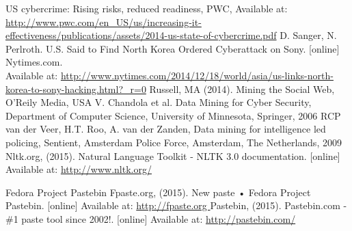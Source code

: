 \documentclass[12pt]{article}
\begin{document}
 
 
\printglossaries
\newpage

\begin{thebibliography}{99}
US cybercrime: Rising risks, reduced readiness, PWC, Available at: \url{http://www.pwc.com/en_US/us/increasing-it-effectiveness/publications/assets/2014-us-state-of-cybercrime.pdf}
	 D. Sanger, N. Perlroth.  U.S. Said to Find North Korea Ordered Cyberattack on Sony. [online] Nytimes.com. \\Available at: \url{http://www.nytimes.com/2014/12/18/world/asia/us-links-north-korea-to-sony-hacking.html?_r=0}
  Russell, MA (2014). Mining the Social Web, O'Reily Media, USA
    V. Chandola et al. Data Mining for Cyber Security, Department of Computer Science, University of Minnesota, Springer, 2006
   RCP van der Veer, H.T. Roo,  A. van der Zanden, Data mining for intelligence led policing, Sentient, Amsterdam Police Force, Amsterdam, The Netherlands, 2009
Nltk.org, (2015). Natural Language Toolkit - NLTK 3.0 documentation. [online] Available at: \url{http://www.nltk.org/}

Fedora Project Pastebin Fpaste.org, (2015). New paste • Fedora Project Pastebin. [online] Available at:  
\url{http://fpaste.org }
Pastebin, (2015). Pastebin.com - \#1 paste tool since 2002!. [online] Available at:     \url{http://pastebin.com/}


\end{thebibliography}
\end{document}
